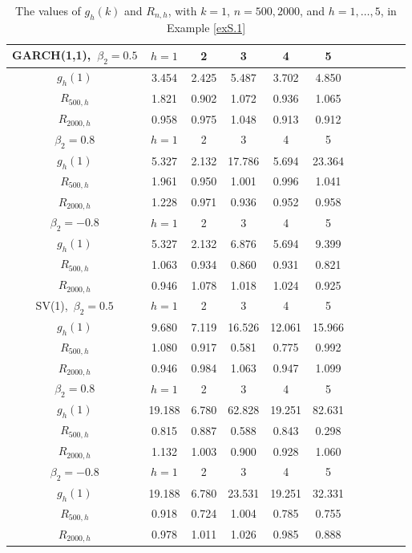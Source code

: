 \documentclass[ejsv2]{imsart}
\theoremstyle{plain}
\theoremstyle{definition}
\theoremstyle{remark}
\begin{document}
\begin{table}
\caption{The values of $g_{h}(k)$ and $R_{n,h}$, with $k=1$, $n=500, 2000$, and $h=1,\ldots, 5$, in Example \ref{exS.1}}
\label{tabS.1}
\centering
\begin{tabular}{ccccccccccc} \hline
    GARCH(1,1),\ $\beta_2=0.5$& $h=1$ & 2 & 3 & 4 & 5 \\ \hline
     $g_{h}(1)$ &3.454 & 2.425 & 5.487 & 3.702 & 4.850 \\ \hline
   $R_{500,h}$ &1.821 & 0.902 & 1.072 & 0.936 & 1.065 \\
   $R_{2000,h}$ &0.958 & 0.975 & 1.048 & 0.913 & 0.912 \\ \hline 
      $\beta_2=0.8$& $h=1$ & 2 & 3 & 4 & 5 \\ \hline
    $g_{h}(1)$ &5.327 & 2.132 & 17.786 & 5.694 & 23.364 \\ \hline
   $R_{500,h}$ &1.961 & 0.950 & 1.001 & 0.996 & 1.041 \\
   $R_{2000,h}$ &1.228 & 0.971 & 0.936 & 0.952 & 0.958 \\ \hline 
        $\beta_2=-0.8$& $h=1$ & 2 & 3 & 4 & 5 \\ \hline
    $g_{h}(1)$ &5.327 & 2.132 & 6.876 & 5.694 & 9.399 \\ \hline
   $R_{500,h}$ &1.063 & 0.934 & 0.860 & 0.931 & 0.821 \\
   $R_{2000,h}$ &0.946 & 1.078 & 1.018 & 1.024 & 0.925 \\ \hline \hline
   SV(1),\ $\beta_2=0.5$ & $h=1$ & 2 & 3 & 4 & 5 \\ \hline
    $g_{h}(1)$ & 9.680 & 7.119 & 16.526 & 12.061 & 15.966 \\ \hline
   $R_{500,h}$ & 1.080 & 0.917 & 0.581 & 0.775 & 0.992 \\
   $R_{2000,h}$ & 0.946 & 0.984 & 1.063 & 0.947 & 1.099 \\ \hline
      $\beta_2=0.8$ & $h=1$ & 2 & 3 & 4 & 5 \\ \hline
    $g_{h}(1)$ & 19.188 & 6.780 & 62.828 & 19.251 & 82.631 \\ \hline
   $R_{500,h}$ & 0.815 & 0.887 & 0.588 & 0.843 & 0.298 \\
   $R_{2000,h}$ & 1.132 & 1.003 & 0.900 & 0.928 & 1.060 \\ \hline
      $\beta_2=-0.8$ & $h=1$ & 2 & 3 & 4 & 5 \\ \hline
    $g_{h}(1)$ & 19.188 & 6.780 & 23.531 & 19.251 & 32.331 \\ \hline
   $R_{500,h}$ & 0.918 & 0.724 & 1.004 & 0.785 & 0.755 \\
   $R_{2000,h}$ & 0.978 & 1.011 & 1.026 & 0.985 & 0.888 \\ \hline
  \end{tabular}
\end{table}
\end{document}
